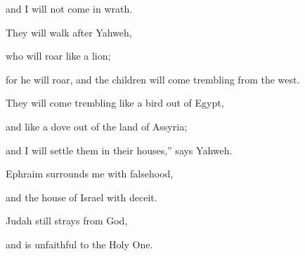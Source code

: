 {\par }{\QB and I will not come in wrath.
\par }{\Q {}They will walk after Yahweh,
\par }{\QB who will roar like a lion;
\par }{\QB for he will roar, and the children will come trembling from the west.
\par }{\Q {}They will come trembling like a bird out of Egypt,
\par }{\QB and like a dove out of the land of Assyria;
\par }{\Q and I will settle them in their houses,” says Yahweh.
\par }{\BB \par }{\Q {}Ephraim surrounds me with falsehood,
\par }{\QB and the house of Israel with deceit.
\par }{\QB Judah still strays from God,
\par }{\QB and is unfaithful to the Holy One.

}
